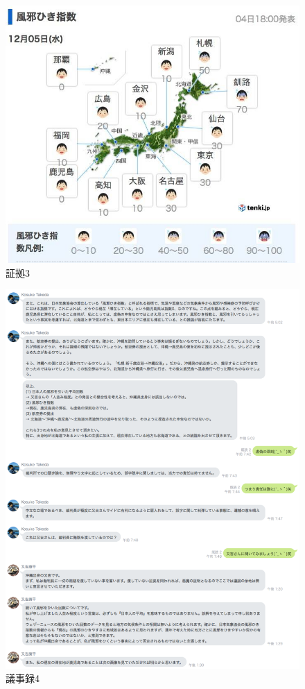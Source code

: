 \begin{figure}[H]
  \centering
  \includegraphics[clip,scale=0.2]{./section/Taira/figures/fig3}
  \caption{証拠3}
\label{fig3}
\end{figure}

\begin{figure}[H]
  \centering
  \includegraphics[clip,scale=0.5]{./section/Taira/figures/giji4.png}
  \caption{議事録4}
\label{giji4}
\end{figure}

